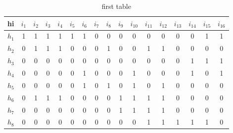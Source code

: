 \begin{table*}[!ht]
	\centering
		\caption{first table}
		\begin{tabular}{l|cccc cccc cccc cccc}
			\toprule
hi    & $i_1$ & $i_2$ & $i_3$ & $i_4$ & $i_5$ & $i_6$ & $i_7$ & $i_8$ & $i_9$ & $i_{10}$ & $i_{11}$ & $i_{12}$ & $i_{13}$ & $i_{14}$ & $i_{15}$ & $i_{16}$ \\
			\midrule
$h_1$ & 1  & 1 & 1  & 1  & 1 & 1 & 0 & 0  & 0 & 0 & 0 & 0  & 0 & 0  & 1 & 1 \\
$h_2$ & 0  & 1 & 1  & 1  & 0 & 0 & 0 & 1  & 0 & 0 & 1 & 1  & 0 & 0  & 0 & 0 \\
$h_3$ & 0  & 0 & 0  & 0  & 0 & 0 & 0 & 0  & 0 & 0 & 0 & 0  & 0 & 1  & 1 & 1 \\
$h_4$ & 0  & 0 & 0  & 0  & 0 & 1 & 0 & 0  & 0 & 1 & 0 & 0  & 0 & 1  & 0 & 1 \\
$h_5$ & 0  & 0 & 0  & 0  & 0 & 1 & 0 & 1  & 0 & 1 & 0 & 1  & 0 & 0  & 0 & 0 \\
$h_6$ & 0  & 1 & 1  & 1  & 0 & 0 & 0 & 0  & 1 & 1 & 1 & 1  & 0 & 0  & 0 & 0 \\
$h_7$ & 0  & 0 & 0  & 0  & 0 & 0 & 0 & 0  & 1 & 1 & 1 & 1  & 0 & 0  & 0 & 0 \\
$h_8$ & 0  & 0 & 0  & 0  & 0 & 0 & 0 & 0  & 0 & 0 & 1 & 1  & 1 & 1  & 1 & 0 \\
			\bottomrule
		\end{tabular}
\end{table*}
